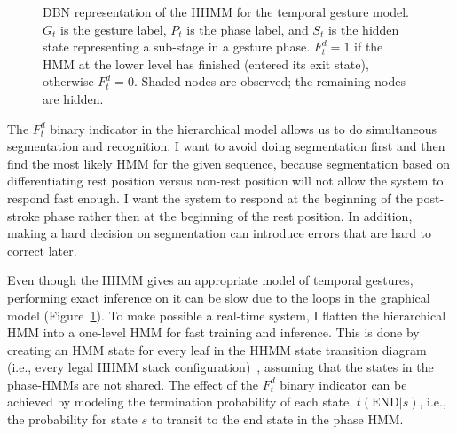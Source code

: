 \begin{figure}[!tbh]
\centering
  \caption{DBN representation of the HHMM for the temporal gesture model. $G_t$ is the gesture label, $P_t$ is the
phase label, and $S_t$ is the hidden state representing a sub-stage in a
gesture phase. $F_t^d = 1$ if the HMM at the lower level has finished
(entered its exit state), otherwise $F_t^d = 0$. Shaded nodes are observed; the
remaining nodes are hidden.}
  \label{fig:ahmm}
\end{figure}

The $F_t^d$ binary indicator in the hierarchical model allows us to do
simultaneous segmentation and recognition. I want to avoid doing segmentation first and then find the most
likely HMM for the given sequence, because segmentation based on
differentiating rest position versus non-rest position will not allow the system
to respond fast enough. I want the system to respond at the beginning of the
post-stroke phase rather then at the beginning of the rest position. In
addition, making a hard decision on segmentation can introduce errors that
are hard to correct later. 

Even though the HHMM gives an appropriate model of temporal gestures,
performing exact inference on it can be slow due to the loops in the graphical
model (Figure~\ref{fig:ahmm}). To make possible a real-time system, I flatten
the hierarchical HMM into a one-level HMM for fast training and inference. This
is done by creating an HMM state for every leaf in the HHMM state transition
diagram (i.e., every legal HHMM stack configuration)~\cite{murphy02}, assuming that the states in the
phase-HMMs are not shared.
The effect of the $F_t^d$ binary indicator can be achieved by modeling the termination probability of each
state, $t(\text{END}|s)$, i.e., the probability for state $s$ to transit to the
end state in the phase HMM.

